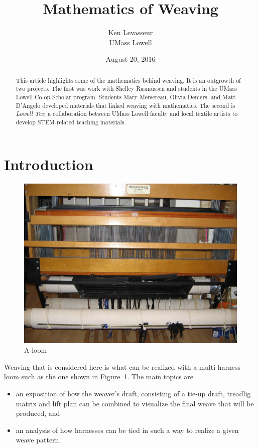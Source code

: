 \documentclass[10pt,]{article}
\title{Mathematics of Weaving}
\author{Ken Levasseur\\
UMass Lowell
}
\date{August 20, 2016}
\theoremstyle{plain}
\begin{document}
\maketitle
\thispagestyle{empty}
\begin{abstract}
This article highlights some of the mathematics behind weaving. It is an outgrowth of two projects. The first was work with Shelley Rasmussen and students in the UMass Lowell Co-op Scholar program.  Students Mary Mersereau, Olivia Demers, and Matt D'Angelo developed materials that linked weaving with mathematics.  The second is \emph{Lowell Tex}, a collaboration between UMass Lowell faculty and local textile artists to develop STEM-related teaching materials.%
\end{abstract}
\typeout{************************************************}
\typeout{************************************************}
\section[Introduction]{Introduction}\label{section-introduction}
\leavevmode%
\begin{figure}
\centering
\includegraphics[width=0.8\linewidth]{images/loom.png}
\caption{A loom
                \label{fig-loom}}
\end{figure}
Weaving that is considered here is what can be realized with a multi-harness loom such as the one shown in \hyperref[fig-loom]{Figure~\ref{fig-loom}}.
The main topics are %
\leavevmode%
\begin{itemize}[label=\textbullet]
\item{}an exposition of how the weaver's draft, consisting of a tie-up draft, treadlig matrix and lift plan can
		 be combined to visualize the final weave that will be produced, and%
\item{}an analysis of how harnesses can be tied in such a way to realize a given weave pattern.%
\end{itemize}
\typeout{************************************************}
\typeout{************************************************}
\end{document}
